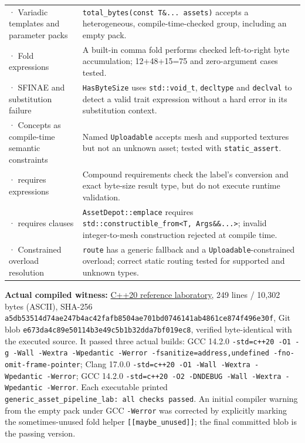 {\begin{longtable}[]{@{}
  >{\raggedright\arraybackslash}p{}
  >{\raggedright\arraybackslash}p{}@{}}
210 · Variadic templates and parameter packs & \texttt{total\_bytes(const\ T\&...\ assets)} accepts a heterogeneous, compile-time-checked group, including an empty pack. \\
211 · Fold expressions & A built-in comma fold performs checked left-to-right byte accumulation; 12+48+15=75 and zero-argument cases tested. \\
212 · SFINAE and substitution failure & \texttt{HasByteSize} uses \texttt{std::void\_t}, \texttt{decltype} and \texttt{declval} to detect a valid trait expression without a hard error in its substitution context. \\
213 · Concepts as compile-time semantic constraints & Named \texttt{Uploadable} accepts mesh and supported textures but not an unknown asset; tested with \texttt{static\_assert}. \\
214 · requires expressions & Compound requirements check the label's conversion and exact byte-size result type, but do not execute runtime validation. \\
215 · requires clauses & \texttt{AssetDepot::emplace} requires \texttt{std::constructible\_from\textless{}T,\ Args\&\&...\textgreater{}}; invalid integer-to-mesh construction rejected at compile time. \\
216 · Constrained overload resolution & \texttt{route} has a generic fallback and a \texttt{Uploadable}-constrained overload; correct static routing tested for supported and unknown types. \\
\end{longtable}
}

\textbf{Actual compiled witness:} \hyperref[source-file-a5db53514d74ae247b4ac42f]{C++20 reference laboratory}, 249 lines / 10,302 bytes (ASCII), SHA-256 \texttt{a5db53514d74ae247b4ac42fafb8504ae701bd0746141ab4861ce874f496e30f}, Git blob \texttt{e673da4c89e50114b3e49c5b1b32dda7bf019ec8}, verified byte-identical with the executed source. It passed three actual builds: GCC 14.2.0 \texttt{-std=c++20\ -O1\ -g\ -Wall\ -Wextra\ -Wpedantic\ -Werror\ -fsanitize=address,undefined\ -fno-omit-frame-pointer}; Clang 17.0.0 \texttt{-std=c++20\ -O1\ -Wall\ -Wextra\ -Wpedantic\ -Werror}; GCC 14.2.0 \texttt{-std=c++20\ -O2\ -DNDEBUG\ -Wall\ -Wextra\ -Wpedantic\ -Werror}. Each executable printed \texttt{generic\_asset\_pipeline\_lab:\ all\ checks\ passed}. An initial compiler warning from the empty pack under GCC \texttt{-Werror} was corrected by explicitly marking the sometimes-unused fold helper \texttt{{[}{[}maybe\_unused{]}{]}}; the final committed blob is the passing version.

